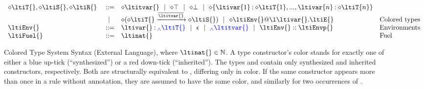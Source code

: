 \begin{figure}
$$\begin{array}{lrll}
\ltiSynChk{\ltiT{}}, \ltiSynChk{\ltiS{}}, \ltiSynChk{\ltiR{}} &::=& 
                         \ltiSynChk{\ltitvar{}} \alt
                         \ltiSynChk{\ltiTop} \alt
                         \ltiSynChk{\ltiBot} \alt
                         \ltiSynChk{\ltiRec{\hastype{\ltivar{1}}{\ltiSynChk{\ltiT{1}}},...,\hastype{\ltivar{n}}{\ltiSynChk{\ltiT{n}}}}}
                                    \\&\alt&
                         \ltiSynChk{\ltiArrow{\ltiSynChk{\ltiT{}}}{\ova{\ltitvar{}}}{\ltiSynChk{\ltiS{}}}} \alt
                         \ltiSynChk{\ltiClosure{\ltiEnv{}}{\ltiufun{\ltivar{}}{\ltiE{}}}}
                      &\mbox{Colored types} \\
  \ltiEnv{} &::=& \hastype{\ltivar{}}{\ltiSyn{\ltiT{}}} \alt
                  \ltiEmptyEnv \alt
                  \ltiSyn{\ltitvar{}} \alt
                  \ltiEnvConcat{\ltiEnv{}}{\ltiEnvp{}}
                      &\mbox{Environments} \\
  \ltiFuel{} &::=& \ltinat{}
                      &\mbox{Fuel} \\
\end{array}
$$
\caption{Colored Type System Syntax (External Language),
  where $\ltinat{} \in \mathbb{N}$.
A type constructor's color \ltiSynChk{} stands for exactly one of either a blue up-tick \ltiSyn{} (``synthesized'')
or a red down-tick \ltiChk{} (``inherited'').
The types \ltiSyn{\ltiT{}} and \ltiChk{\ltiT{}} contain only synthesized and inherited constructors, respectively.
Both are structurally equivalent to \ltiSynChk{\ltiT{}}, differing only in color.
If the same constructor appears more than once in a rule without annotation,
they are assumed to have the same color, and similarly for two occurrences of \ltiSynChk{\ltiT{}}.
}
\end{figure}

